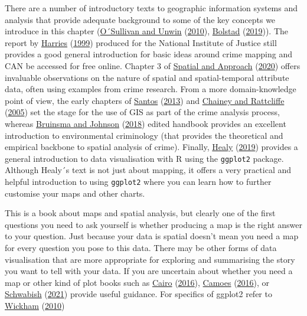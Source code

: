 \documentclass[
]{book}
\begin{document}
There are a number of introductory texts to geographic information systems and analysis that provide adequate background to some of the key concepts we introduce in this chapter (\protect\hyperlink{ref-OSullivan_2010}{O´Sullivan and Unwin} (\protect\hyperlink{ref-OSullivan_2010}{2010}), \protect\hyperlink{ref-Bolstad_2019}{Bolstad} (\protect\hyperlink{ref-Bolstad_2019}{2019})). The report by \protect\hyperlink{ref-Harries_1999}{Harries} (\protect\hyperlink{ref-Harries_1999}{1999}) produced for the National Institute of Justice still provides a good general introduction for basic ideas around crime mapping and CAN be accessed for free online. Chapter 3 of \protect\hyperlink{ref-Haining_2020}{Spatial and Approach} (\protect\hyperlink{ref-Haining_2020}{2020}) offers invaluable observations on the nature of spatial and spatial-temporal attribute data, often using examples from crime research. From a more domain-knowledge point of view, the early chapters of \protect\hyperlink{ref-Boba_2013}{Santos} (\protect\hyperlink{ref-Boba_2013}{2013}) and \protect\hyperlink{ref-Chainey_2005}{Chainey and Rattcliffe} (\protect\hyperlink{ref-Chainey_2005}{2005}) set the stage for the use of GIS as part of the crime analysis process, whereas \protect\hyperlink{ref-Bruinsma_2018}{Bruinsma and Johnson} (\protect\hyperlink{ref-Bruinsma_2018}{2018}) edited handbook provides an excellent introduction to environmental criminology (that provides the theoretical and empirical backbone to spatial analysis of crime). Finally, \protect\hyperlink{ref-Healy_2019}{Healy} (\protect\hyperlink{ref-Healy_2019}{2019}) provides a general introduction to data visualisation with R using the \texttt{ggplot2} package. Although Healy´s text is not just about mapping, it offers a very practical and helpful introduction to using \texttt{ggplot2} where you can learn how to further customise your maps and other charts.

This is a book about maps and spatial analysis, but clearly one of the first questions you need to ask yourself is whether producing a map is the right answer to your question. Just because your data is spatial doesn't mean you need a map for every question you pose to this data. There may be other forms of data visualisation that are more appropriate for exploring and summarising the story you want to tell with your data. If you are uncertain about whether you need a map or other kind of plot books such as \protect\hyperlink{ref-Cairo_2016}{Cairo} (\protect\hyperlink{ref-Cairo_2016}{2016}), \protect\hyperlink{ref-Camoes_2016}{Camoes} (\protect\hyperlink{ref-Camoes_2016}{2016}), or \protect\hyperlink{ref-Schwabish_2021}{Schwabish} (\protect\hyperlink{ref-Schwabish_2021}{2021}) provide useful guidance. For specifics of ggplot2 refer to \protect\hyperlink{ref-Wickham_2010}{Wickham} (\protect\hyperlink{ref-Wickham_2010}{2010})
\end{document}
